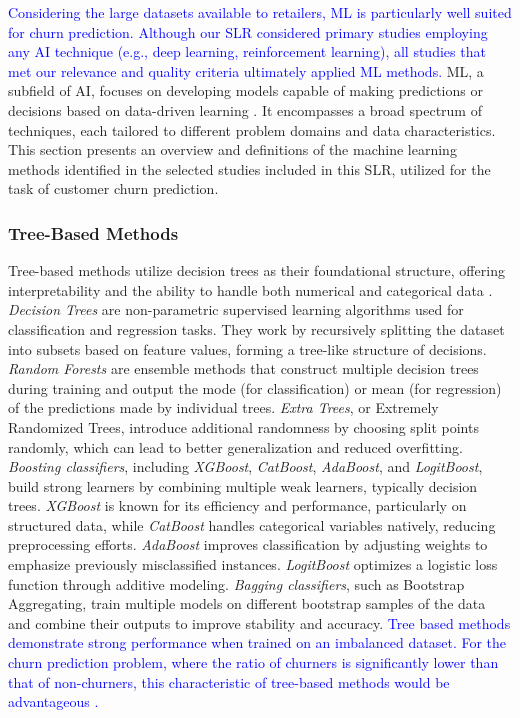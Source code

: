 \documentclass[preprint,12pt]{elsarticle}
\begin{document}
\textcolor{blue}{Considering the large datasets available to retailers, ML is particularly well suited for churn prediction. Although our SLR considered primary studies employing any AI technique (e.g., deep learning, reinforcement learning), all studies that met our relevance and quality criteria ultimately applied ML methods.} ML, a subfield of AI, focuses on developing models capable of making predictions or decisions based on data-driven learning \cite{Sarker2021}. It encompasses a broad spectrum of techniques, each tailored to different problem domains and data characteristics. This section presents an overview and definitions of the machine learning methods identified in the selected studies included in this SLR, utilized for the task of customer churn prediction.

\subsubsection{Tree-Based Methods}

Tree-based methods utilize decision trees as their foundational structure, offering interpretability and the ability to handle both numerical and categorical data \cite{james2023tree}. \textit{Decision Trees} are non-parametric supervised learning algorithms used for classification and regression tasks. They work by recursively splitting the dataset into subsets based on feature values, forming a tree-like structure of decisions. \textit{Random Forests} are ensemble methods that construct multiple decision trees during training and output the mode (for classification) or mean (for regression) of the predictions made by individual trees. \textit{Extra Trees}, or Extremely Randomized Trees, introduce additional randomness by choosing split points randomly, which can lead to better generalization and reduced overfitting. \textit{Boosting classifiers}, including \textit{XGBoost}, \textit{CatBoost}, \textit{AdaBoost}, and \textit{LogitBoost}, build strong learners by combining multiple weak learners, typically decision trees. \textit{XGBoost} is known for its efficiency and performance, particularly on structured data, while \textit{CatBoost} handles categorical variables natively, reducing preprocessing efforts. \textit{AdaBoost} improves classification by adjusting weights to emphasize previously misclassified instances. \textit{LogitBoost} optimizes a logistic loss function through additive modeling. \textit{Bagging classifiers}, such as Bootstrap Aggregating, train multiple models on different bootstrap samples of the data and combine their outputs to improve stability and accuracy. \textcolor{blue}{Tree based methods demonstrate strong performance when trained on an imbalanced dataset. For the churn prediction problem, where the ratio of churners is significantly lower than that of non-churners, this characteristic of tree-based methods would be advantageous \cite{breiman2001random,chen2016xgboost}. }
\end{document}
